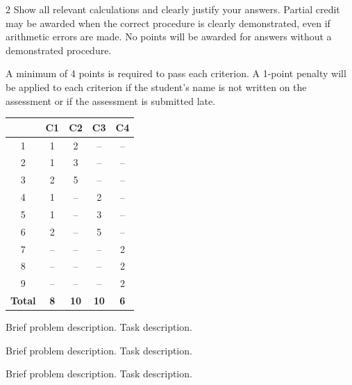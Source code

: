 	\begin{multicols}{2}
		\vspace{-0.25cm}
		Show all relevant calculations and clearly justify your answers. Partial credit may be awarded when the correct procedure is clearly demonstrated, even if arithmetic errors are made. No points will be awarded for answers without a demonstrated procedure.
		
		A minimum of 4 points is required to pass each criterion. A 1-point penalty will be applied to each criterion if the student's name is not written on the assessment or if the assessment is submitted late.
		
		\begin{center}
			\begin{tabular}{|c|c|c|c|c|}
				\hline
				\textbf{\textnumero} & \textbf{C1} & \textbf{C2} & \textbf{C3} & \textbf{C4} \\ \hline
				1 & 1 & 2 & -- & -- \\ \hline
				2 & 1 & 3 & -- & -- \\ \hline
				3 & 2 & 5 & -- & -- \\ \hline
				4 & 1 & -- & 2 & -- \\ \hline
				5 & 1 & -- & 3 & -- \\ \hline
				6 & 2 & -- & 5 & -- \\ \hline
				7 & -- & -- & -- & 2 \\ \hline
				8 & -- & -- & -- & 2 \\ \hline
				9 & -- & -- & -- & 2 \\ \hline
				\textbf{Total} & \textbf{8} & \textbf{10} & \textbf{10} & \textbf{6} \\ \hline
			\end{tabular}
		\end{center}
		
		Brief problem description. Task description.
		
		Brief problem description. Task description.
		
		Brief problem description. Task description.
		

\end{multicols}
